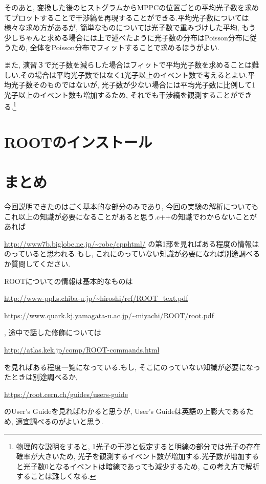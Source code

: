\documentclass[uplatex,10pt,a4j]{jsarticle}
\begin{document}
そのあと, 変換した後のヒストグラムからMPPCの位置ごとの平均光子数を求めてプロットすることで干渉縞を再現することができる.平均光子数については様々な求め方があるが, 簡単なものについては光子数で重みづけした平均, もう少しちゃんと求める場合には上で述べたように光子数の分布はPoisson分布に従うため, 全体をPoisson分布でフィットすることで求めるほうがよい.

また, 演習３で光子数を減らした場合はフィットで平均光子数を求めることは難しい.その場合は平均光子数ではなく1光子以上のイベント数で考えるとよい.平均光子数そのものではないが, 光子数が少ない場合には平均光子数に比例して1光子以上のイベント数も増加するため, それでも干渉縞を観測することができる.\footnote{物理的な説明をすると, 1光子の干渉と仮定すると明線の部分では光子の存在確率が大きいため, 光子を観測するイベント数が増加する.光子数が増加すると光子数0となるイベントは暗線であっても減少するため, この考え方で解析することは難しくなる.}

\clearpage
\section{ROOTのインストール}
\label{sec:root_installation}


\clearpage
\section{まとめ}
\label{sec:lastsection}
今回説明できたのはごく基本的な部分のみであり, 今回の実験の解析についてもこれ以上の知識が必要になることがあると思う.c++の知識でわからないことがあれば

\url{http://www7b.biglobe.ne.jp/~robe/cpphtml/}
の第1部を見ればある程度の情報はのっていると思われる.もし, これにのっていない知識が必要になれば別途調べるか質問してください.

ROOTについての情報は基本的なものは

\url{http://www-ppl.s.chiba-u.jp/~hiroshi/ref/ROOT_text.pdf}

\url{https://www.quark.kj.yamagata-u.ac.jp/~miyachi/ROOT/root.pdf}

, 途中で話した修飾については

\url{http://atlas.kek.jp/comp/ROOT-commands.html}

を見ればある程度一覧になっている.もし, そこにのっていない知識が必要になったときは別途調べるか, 

\url{https://root.cern.ch/guides/users-guide}

のUser's Guideを見ればわかると思うが, User's Guideは英語の上膨大であるため, 適宜調べるのがよいと思う.
\end{document}
